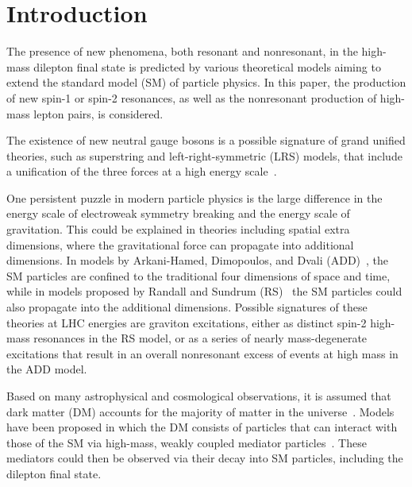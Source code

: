 \documentclass[11pt,twoside,a4paper,cmspaper,final,collab]{cms-tdr}
\begin{document}

\maketitle 

\section{Introduction}
The presence of new phenomena, both resonant and nonresonant, in the high-mass dilepton final state is predicted by various theoretical models aiming to extend the standard model (SM) of particle physics. In this paper, the production of new spin-1 or spin-2 resonances, as well as the nonresonant production of high-mass lepton pairs, is considered. 

The existence of new neutral gauge bosons is a possible signature of grand unified theories, such as superstring and left-right-symmetric (LRS) models, that include a unification of the three forces at a high energy scale~\cite{Leike:1998wr,Zp_SSM_1}.  

One persistent puzzle in modern particle physics is the large difference in the energy scale of electroweak symmetry breaking and the energy scale of gravitation.  This could be explained in theories including spatial extra dimensions, where the gravitational force can propagate into additional dimensions. In models by Arkani-Hamed, Dimopoulos, and Dvali (ADD)~\cite{arkani98:hlz,arkani99:hlz}, the SM particles are confined to the traditional four dimensions of space and time, while in models proposed by Randall and Sundrum (RS)~\cite{Randall:1999ee} the SM particles could also propagate into the additional dimensions. Possible signatures of these theories at LHC energies are graviton excitations, either as distinct spin-2 high-mass resonances in the RS model, or as a series of nearly mass-degenerate excitations that result in an overall nonresonant excess of events at high mass in the ADD model. 

Based on many astrophysical and cosmological observations, it is assumed that dark matter (DM) accounts for the majority of matter in the universe~\cite{Ade:2015xua}. Models have been proposed in which the DM consists of particles that can interact with those of the SM via high-mass, weakly coupled mediator particles~\cite{Alves:2011wf}. These mediators could then be observed via their decay into SM particles, including the dilepton final state.  
\end{document}
